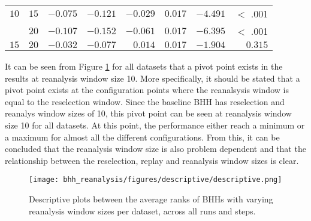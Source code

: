 \begin{table}[htbp]
{\begin{tabular}{lrrrrrrr}
                  $10$                 & $15$                 & $-0.075$             & $-0.121$                                        & $-0.029$             & $0.017$              & $-4.491$             & $<$ .001    \\
                  $ $                  & $20$                 & $-0.107$             & $-0.152$                                        & $-0.061$             & $0.017$              & $-6.395$             & $<$ .001    \\
                  $15$                 & $20$                 & $-0.032$             & $-0.077$                                        & $0.014$              & $0.017$              & $-1.904$             & $0.315$     \\
                  \bottomrule
            \end{tabular}
      }
\end{table}

It can be seen from Figure \ref{fig:results:reanalysis:descriptive:descriptive} for all datasets that a pivot point exists in the results at reanalysis window size 10. More specifically, it should be stated that a pivot point exists at the configuration points where the reanalsysis window is equal to the reselection window. Since the baseline \Ac{BHH} has reselection and reanalys window sizes of 10, this pivot point can be seen at reanalysis window size 10 for all datasets. At this point, the performance either reach a minimum or a maximum for almost all the different configurations. From this, it can be concluded that the reanalysis window size is also problem dependent and that the relationship between the reselection, replay and reanalysis window sizes is clear.

\begin{figure}[htbp]
      \centering
      \texttt{[image: bhh\_reanalysis/figures/descriptive/descriptive.png]}
      \caption{Descriptive plots between the average ranks of \Acsp{BHH} with varying reanalysis window sizes per dataset, across all runs and steps.}
      \label{fig:results:reanalysis:descriptive:descriptive}
\end{figure}

